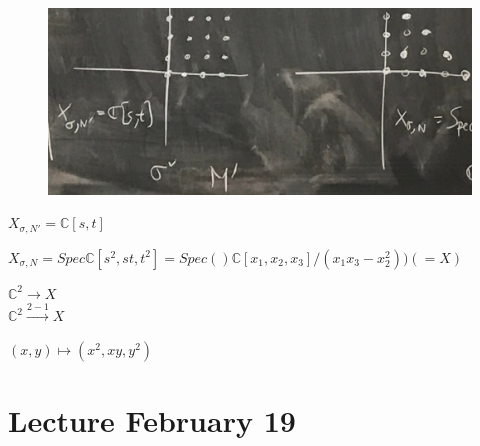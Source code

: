 \documentclass[a4paper,12pt]{amsart}
\newcommand{\C}{\ensuremath{\mathbb{C}}}
\begin{document}
\begin{Eg}
\begin{enumerate}[1)]
	\begin{figure}[htbp]\centering
		\includegraphics[scale=0.1]{pic/2}
	\end{figure}
	
	$X_{\sigma,N'}=\C[s,t]$
	
	$X_{\sigma,N}=Spec\C[s^2,st,t^2]=Spec()\C[x_1,x_2,x_3]/(x_1x_3-x_2^2))(=X)$
	
	$\C^2\to X$
	\\
	
	$\C^2\xrightarrow{2-1} X$
	
	$(x,y)\mapsto (x^2,xy,y^2)$
\end{enumerate}
\end{Eg}

\newpage
\section{Lecture February 19}
\end{document}

